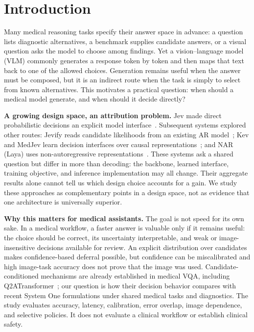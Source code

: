 \section{Introduction}
\label{sec:intro}

Many medical reasoning tasks specify their answer space in advance: a question lists diagnostic alternatives, a benchmark supplies candidate answers, or a visual question asks the model to choose among findings. Yet a vision--language model (VLM) commonly generates a response token by token and then maps that text back to one of the allowed choices. Generation remains useful when the answer must be composed, but it is an indirect route when the task is simply to select from known alternatives. This motivates a practical question: when should a medical model generate, and when should it decide directly?

\textbf{A growing design space, an attribution problem.} Jev made direct probabilistic decisions an explicit model interface~\citep{almeida2026jev}. Subsequent systems explored other routes: Jevify reads candidate likelihoods from an existing AR model~\citep{castro2026jevify,patil2026jevify}; Kev and MedJev learn decision interfaces over causal representations~\citep{palmer2026kev,ma2026medjev}; and NAR (Laya) uses non-autoregressive representations~\citep{nandhakishor2026laya}. These systems ask a shared question but differ in more than decoding: the backbone, learned interface, training objective, and inference implementation may all change. Their aggregate results alone cannot tell us which design choice accounts for a gain. We study these approaches as complementary points in a design space, not as evidence that one architecture is universally superior.

\textbf{Why this matters for medical assistants.} The goal is not speed for its own sake. In a medical workflow, a faster answer is valuable only if it remains useful: the choice should be correct, its uncertainty interpretable, and weak or image-insensitive decisions available for review. An explicit distribution over candidates makes confidence-based deferral possible, but confidence can be miscalibrated and high image-task accuracy does not prove that the image was used. Candidate-conditioned mechanisms are already established in medical VQA, including Q2ATransformer~\citep{liu2023q2atransformer}; our question is how their decision behavior compares with recent System One formulations under shared medical tasks and diagnostics. The study evaluates accuracy, latency, calibration, error overlap, image dependence, and selective policies. It does not evaluate a clinical workflow or establish clinical safety.

